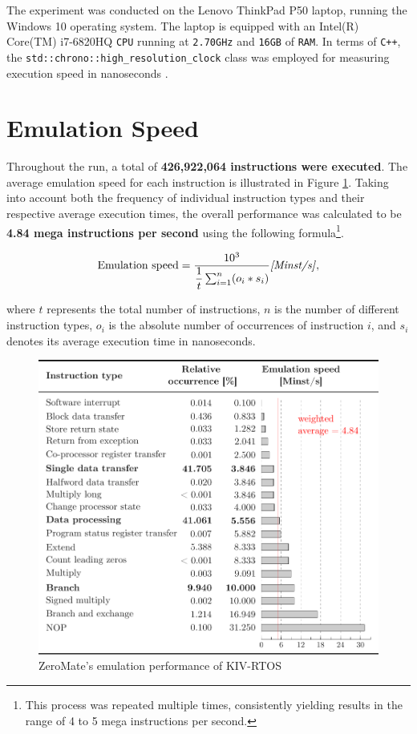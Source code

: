 \documentclass[english, ing, kiv, he, iso690numb, pdf]{fasthesis}
\begin{document}
	\begin{important}
		The experiment was conducted on the Lenovo ThinkPad P50 laptop, running the Windows 10 operating system. The laptop is equipped with an Intel(R) Core(TM) i7-6820HQ \texttt{CPU} running at \texttt{2.70GHz} and \texttt{16GB} of \texttt{RAM}. In terms of \texttt{C++}, the \texttt{std::chrono::high\_resolution\_clock} class was employed for measuring execution speed in nanoseconds \cite{chrono}.
	\end{important}
	
	\newpage
	
	\section{Emulation Speed}
	
	Throughout the run, a total of \textbf{426,922,064 instructions were executed}. The average emulation speed for each instruction is illustrated in Figure \ref{ZeroMate's emulation performance of KIV-RTOS}. Taking into account both the frequency of individual instruction types and their respective average execution times, the overall performance was calculated to be \textbf{4.84 mega instructions per second} using the following formula\footnote{This process was repeated multiple times, consistently yielding results in the range of 4 to 5 mega instructions per second.}.
	
	$$ \text{Emulation speed} = \dfrac{10^{3}}{\dfrac{1}{t} \sum_{i=1}^{n} (o_i * s_i)} \text{\textit{[Minst/s]}}, $$
	
	where $t$ represents the total number of instructions, $n$ is the number of different instruction types, $o_i$ is the absolute number of occurrences of instruction $i$, and $s_i$ denotes its average execution time in nanoseconds.
	
	\begin{figure}[ht]
		\centering
		\includegraphics[width=1.0\textwidth]{img/diagrams/performance.pdf}
		\caption{ZeroMate's emulation performance of KIV-RTOS}
		\label{ZeroMate's emulation performance of KIV-RTOS}
	\end{figure}
	
\end{document}
